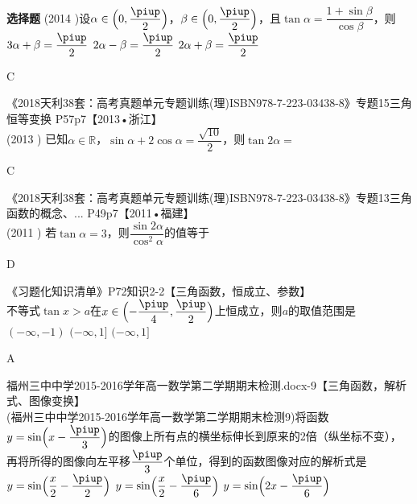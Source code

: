 \begin{exercise}{\bf 选择题}
      (2014 )设$\alpha\in\Bigl(0,\dfrac{\piup}2\Bigr)$，$\beta\in\Bigl(0,\dfrac{\piup}2\Bigr)$，且$\tan\alpha=\dfrac{1+\sin\beta}{\cos\beta}$，则\xz
       {$3\alpha+\beta=\dfrac{\piup}2$}
       {$2\alpha-\beta=\dfrac{\piup}2$}
       {$2\alpha+\beta=\dfrac{\piup}2$}
      \begin{answer}
        C
      \end{answer}
    \item 《2018天利38套：高考真题单元专题训练(理)ISBN978-7-223-03438-8》专题15三角恒等变换 P57p7【2013•浙江】\\
      (2013 )
      已知$\alpha\in\mathbb{R}$，$\sin\alpha+2\cos\alpha=\dfrac{\sqrt{10}}2$，则$\tan{2\alpha}=$\xz
      \begin{answer}
        C
      \end{answer}
    \item 《2018天利38套：高考真题单元专题训练(理)ISBN978-7-223-03438-8》专题13三角函数的概念、... P49p7【2011•福建】\\
      (2011 )
      若$\tan\alpha=3$，则$\dfrac{\sin{2\alpha}}{\cos^2\alpha}$的值等于\xz
      \begin{answer}
        D
      \end{answer}
    \item 《习题化知识清单》P72知识2-2【三角函数，恒成立、参数】\\
      不等式$\tan x>a$在$x\in\Bigl(-\dfrac{\piup}4,\dfrac{\piup}2 \Bigr)$上恒成立，则$a$的取值范围是\xz
      \xx{$(-\infty,-1]$}
        {$(-\infty,-1)$}
        {$(-\infty,1]$}
        {$(-\infty,1]$}
      \begin{answer}
        A
      \end{answer}
    \item 福州三中中学2015-2016学年高一数学第二学期期末检测.docx-9【三角函数，解析式、图像变换】\\
      (福州三中中学2015-2016学年高一数学第二学期期末检测9)将函数$y=\sin\Bigl(x-\dfrac{\piup}3\Bigr)$的图像上所有点的横坐标伸长到原来的2倍（纵坐标不变），再将所得的图像向左平移$\dfrac{\piup}3$个单位，得到的函数图像对应的解析式是\xz
        {$y=\sin\Bigl(\dfrac x2-\dfrac{\piup}2\Bigr)$}
        {$y=\sin\Bigl(\dfrac{x}2-\dfrac{\piup}6\Bigr)$}
        {$y=\sin\Bigl(2x-\dfrac{\piup}6\Bigr)$}
      \begin{answer}

\end{answer}
\end{exercise}
